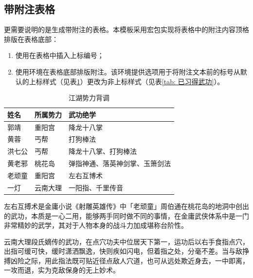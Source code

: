 \newpage
\subsection{带附注表格}

更需要说明的是生成带附注的表格。本模板采用宏包实现将表格中的附注内容顶格排版在表格底部：
\begin{enumerate}
    \item 使用在表格中插入上标编号；
    \setcounter{enumi}{98}%
    \item 使用环境在表格底部排版附注。该环境提供选项用于将附注文本前的标号从默认的上标样式（见表\ref{tab: 江湖势力背调}）更改为非上标样式（见表\ref{tab: 已习得武功}）。
\end{enumerate}

\begin{table}[!ht]
    \caption{江湖势力背调} \label{tab: 江湖势力背调}
    \begin{threeparttable}
        \begin{tabular}{p{2cm} p{3cm}<{\centering} p{7cm}<{\raggedleft}}
            \toprule
            \textbf{姓名} & \textbf{所属势力} & \textbf{武功绝学} \\
            \midrule
            郭靖 & 重阳宫 & 降龙十八掌 \\
            黄蓉 & 丐帮 & 打狗棒法 \\
            洪七公 & 丐帮 & 降龙十八掌、打狗棒法 \\
            黄老邪 & 桃花岛 & 弹指神通、落英神剑掌、玉箫剑法 \\
            老顽童 & 重阳宫 & 左右互博术\tnote{1} \\
            一灯 & 云南大理 & 一阳指\tnote{2}、千里传音 \\
            \bottomrule
        \end{tabular}
        \begin{tablenotes}
            \item[1] 左右互搏术是金庸小说《射雕英雄传》中「老顽童」周伯通在桃花岛的地洞中创出的武功，本质是一心二用，能够两手同时做不同的事情，在金庸武侠体系中是一门非常精妙的武学，其对于人物本身的战斗力加成堪称台阶性。
            \item[2] 云南大理段氏嫡传的武功，在点穴功夫中位居天下第一，运功后以右手食指点穴，出指可缓可快，缓时潇洒飘逸，快则疾如闪电，但着指之处，分毫不差。当与敌挣搏凶险之际，用此指法既可贴近径点敌人穴道，也可从远处欺近身去，一中即离，一攻而退，实为克敌保身的无上妙术。
        \end{tablenotes}
    \end{threeparttable}
\end{table}

